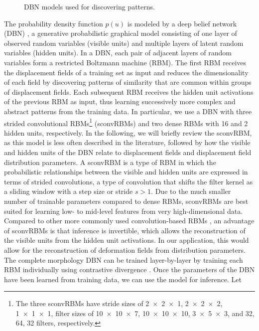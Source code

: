 \begin{figure}[tb]
\centering

\caption{DBN models used for discovering patterns.}
\end{figure}

The probability density function $p(u)$ is modeled by a deep belief network
(DBN) \citep{hinton2006b}, a generative probabilistic graphical model consisting
of one layer of observed random variables (visible units) and multiple layers of
latent random variables (hidden units). In a DBN, each pair of adjacent layers
of random variables form a restricted Boltzmann machine (RBM). The first RBM
receives the displacement fields of a training set as input and reduces the
dimensionality of each field by discovering patterns of similarity that are
common within groups of displacement fields. Each subsequent RBM receives the
hidden unit activations of the previous RBM as input, thus learning successively
more complex and abstract patterns from the training data. In particular, we use
a DBN with three strided convolutional RBMs\footnote{The three sconvRBMs have
stride sizes of \num{2x2x1}, \num{2x2x2}, \num{1x1x1}, filter sizes of
\num{10x10x7}, \num{10x10x10}, \num{3x5x3}, and 32, 64, 32 filters,
respectively.} (sconvRBMs) and two dense RBMs \cite{Hinton2010} with 16 and 2
hidden units, respectively. In the following, we will briefly review the
sconvRBM, as this model is less often described in the literature, followed by
how the visible and hidden units of the DBN relate to displacement fields and
displacement field distribution parameters. A sconvRBM is a type of RBM in which
the probabilistic relationships between the visible and hidden units are
expressed in terms of strided convolutions, a type of convolution that shifts
the filter kernel as a sliding window with a step size or stride $s > 1$. Due to
the much smaller number of trainable parameters compared to dense RBMs,
sconvRBMs are best suited for learning low- to mid-level features from very
high-dimensional data. Compared to other more commonly used convolution-based
RBMs \cite{Lee2009}, an advantage of sconvRBMs is that inference is invertible,
which allows the reconstruction of the visible units from the hidden unit
activations. In our application, this would allow for the reconstruction of
deformation fields from distribution parameters. The complete morphology DBN can
be trained layer-by-layer by training each RBM individually using contrastive
divergence \cite{Hinton2006b}. Once the parameters of the DBN have been learned
from training data, we can use the model for inference. Let
